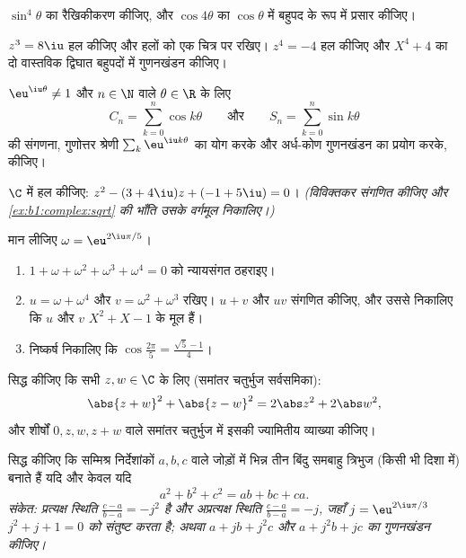 \begin{exercise}[$\star$]\label{exo:b1:complex:4}
$\sin^4\theta$ का रैखिकीकरण कीजिए, और $\cos 4\theta$ का $\cos\theta$ में
बहुपद के रूप में प्रसार कीजिए।
\end{exercise}

\begin{exercise}[$\star$]\label{exo:b1:complex:5}
$z^3 = 8\iu$ हल कीजिए और हलों को एक चित्र पर रखिए। $z^4 = -4$ हल कीजिए और
$X^4 + 4$ का दो वास्तविक द्विघात बहुपदों में गुणनखंडन कीजिए।
\end{exercise}

\begin{exercise}[$\star\star$]\label{exo:b1:complex:6}
$\eu^{\iu\theta} \neq 1$ और $n \in \N$ वाले $\theta \in \R$ के लिए
\[
C_n = \sum_{k=0}^{n} \cos k\theta
\qquad\text{और}\qquad
S_n = \sum_{k=0}^{n} \sin k\theta
\]
की संगणना, गुणोत्तर श्रेणी $\sum_k \eu^{\iu k\theta}$ का योग करके और
अर्ध-कोण गुणनखंडन का प्रयोग करके, कीजिए।
\end{exercise}

\begin{exercise}[$\star\star$]\label{exo:b1:complex:7}
$\C$ में हल कीजिए: $z^2 - (3 + 4\iu) z + (-1 + 5\iu) = 0$। \emph{(विविक्तकर
संगणित कीजिए और \cref{ex:b1:complex:sqrt} की भाँति उसके वर्गमूल निकालिए।)}
\end{exercise}

\begin{exercise}[$\star\star$]\label{exo:b1:complex:8}
मान लीजिए $\omega = \eu^{2\iu\pi/5}$।
\begin{enumerate}
  \item $1 + \omega + \omega^2 + \omega^3 + \omega^4 = 0$ को न्यायसंगत
  ठहराइए।
  \item $u = \omega + \omega^4$ और $v = \omega^2 + \omega^3$ रखिए। $u + v$
  और $uv$ संगणित कीजिए, और उससे निकालिए कि $u$ और $v$ $X^2 + X - 1$ के मूल
  हैं।
  \item निष्कर्ष निकालिए कि $\cos\frac{2\pi}{5} = \frac{\sqrt 5 - 1}{4}$।
\end{enumerate}
\end{exercise}

\begin{exercise}[$\star\star$]\label{exo:b1:complex:9}
सिद्ध कीजिए कि सभी $z, w \in \C$ के लिए (समांतर चतुर्भुज सर्वसमिका):
\[
\abs{z + w}^2 + \abs{z - w}^2 = 2\abs z^2 + 2\abs w^2 ,
\]
और शीर्षों $0, z, w, z + w$ वाले समांतर चतुर्भुज में इसकी ज्यामितीय व्याख्या
कीजिए।
\end{exercise}

\begin{exercise}[$\star\star\star$]\label{exo:b1:complex:10}
सिद्ध कीजिए कि सम्मिश्र निर्देशांकों $a, b, c$ वाले जोड़ों में भिन्न तीन
बिंदु समबाहु त्रिभुज (किसी भी दिशा में) बनाते हैं यदि और केवल यदि
\[
a^2 + b^2 + c^2 = ab + bc + ca .
\]
\emph{संकेत: प्रत्यक्ष स्थिति $\frac{c-a}{b-a} = -j^2$ है और अप्रत्यक्ष
स्थिति $\frac{c-a}{b-a} = -j$, जहाँ $j = \eu^{2\iu\pi/3}$ $j^2 + j + 1 = 0$
को संतुष्ट करता है; अथवा $a + jb + j^2c$ और $a + j^2 b + jc$ का गुणनखंडन
कीजिए।}
\end{exercise}

